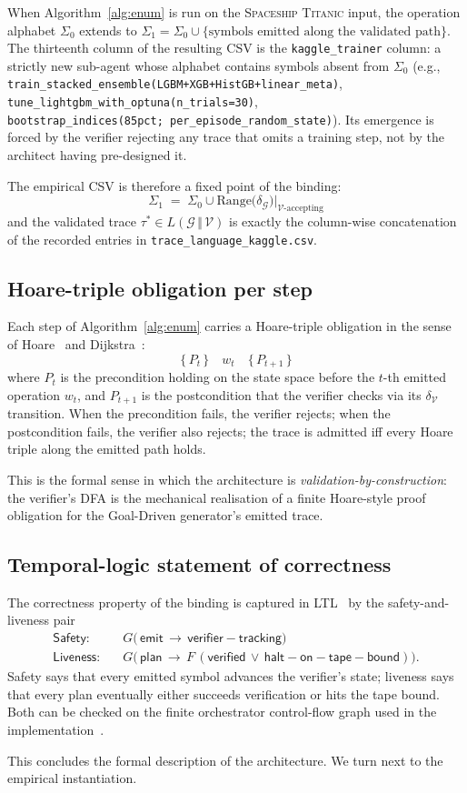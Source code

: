 When Algorithm~\ref{alg:enum} is run on the
\textsc{Spaceship Titanic} input, the operation alphabet
$\Sigma_0$ extends to $\Sigma_1 = \Sigma_0\cup\{\text{symbols
emitted along the validated path}\}$.  The thirteenth column of
the resulting CSV is the \texttt{kaggle\_trainer} column: a
strictly new sub-agent whose alphabet contains symbols absent
from $\Sigma_0$ (e.g.,
\texttt{train\_stacked\_ensemble(LGBM+XGB+HistGB+linear\_meta)},
\texttt{tune\_lightgbm\_with\_optuna(n\_trials=30)},
\texttt{bootstrap\_indices(85pct;\ per\_episode\_random\_state)}).
Its emergence is forced by the verifier rejecting any trace that
omits a training step, not by the architect having pre-designed
it.

The empirical CSV is therefore a fixed point of the binding:
\[
\Sigma_1 \;=\;
\Sigma_0 \cup \mathrm{Range}\bigl(\delta_\mathcal{G}\bigr)
\big|_{\mathcal{V}\text{-accepting}}
\]
and the validated trace $\tau^*\in L(\mathcal{G}\,\Vert\,\mathcal{V})$
is exactly the column-wise concatenation of the recorded entries
in \texttt{trace\_language\_kaggle.csv}.

\subsection{Hoare-triple obligation per step}

Each step of Algorithm~\ref{alg:enum} carries a Hoare-triple
obligation in the sense of
Hoare~\cite{hoare1969axiomatic} and
Dijkstra~\cite{dijkstra1975guarded}:
\[
\{\,P_t\,\}\quad w_t\quad\{\,P_{t+1}\,\}
\]
where $P_t$ is the precondition holding on the state space
before the $t$-th emitted operation $w_t$, and $P_{t+1}$ is the
postcondition that the verifier checks via its
$\delta_\mathcal{V}$ transition.  When the precondition fails,
the verifier rejects; when the postcondition fails, the verifier
also rejects; the trace is admitted iff every Hoare triple
along the emitted path holds.

This is the formal sense in which the architecture is
\emph{validation-by-construction}: the verifier's DFA is the
mechanical realisation of a finite Hoare-style proof obligation
for the Goal-Driven generator's emitted trace.

\subsection{Temporal-logic statement of correctness}

The correctness property of the binding is captured in
LTL~\cite{pnueli1977temporal} by the safety-and-liveness pair
\begin{align*}
\textsf{Safety:}\quad &
G\bigl(\,\mathsf{emit}\,\to\,\mathsf{verifier-tracking}\bigr) \\
\textsf{Liveness:}\quad &
G\bigl(\,\mathsf{plan}\,\to\,F\,(\mathsf{verified}\,\vee\,
\mathsf{halt-on-tape-bound})\bigr).
\end{align*}
Safety says that every emitted symbol advances the verifier's
state; liveness says that every plan eventually either succeeds
verification or hits the tape bound.  Both can be checked on the finite orchestrator control-flow graph
used in the implementation~\cite{clarke1981ctl,clarke1999modelchecking}.

This concludes the formal description of the architecture.  We
turn next to the empirical instantiation.
